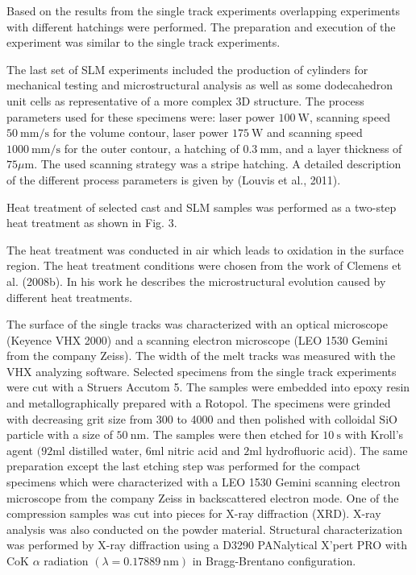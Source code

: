 \documentclass[10pt]{article}
\begin{document}
Based on the results from the single track experiments overlapping experiments with different hatchings were performed. The preparation and execution of the experiment was similar to the single track experiments.

The last set of SLM experiments included the production of cylinders for mechanical testing and microstructural analysis as well as some dodecahedron unit cells as representative of a more complex 3D structure. The process parameters used for these specimens were: laser power $100 \mathrm{~W}$, scanning speed $50 \mathrm{~mm} / \mathrm{s}$ for the volume contour, laser power $175 \mathrm{~W}$ and scanning speed $1000 \mathrm{~mm} / \mathrm{s}$ for the outer contour, a hatching of $0.3 \mathrm{~mm}$, and a layer thickness of $75 \mu \mathrm{m}$. The used scanning strategy was a stripe hatching. A detailed description of the different process parameters is given by (Louvis et al., 2011).

Heat treatment of selected cast and SLM samples was performed as a two-step heat treatment as shown in Fig. 3.

The heat treatment was conducted in air which leads to oxidation in the surface region. The heat treatment conditions were chosen from the work of Clemens et al. (2008b). In his work he describes the microstructural evolution caused by different heat treatments.

The surface of the single tracks was characterized with an optical microscope (Keyence VHX 2000) and a scanning electron microscope (LEO 1530 Gemini from the company Zeiss). The width of the melt tracks was measured with the VHX analyzing software. Selected specimens from the single track experiments were cut with a Struers Accutom 5. The samples were embedded into epoxy resin and metallographically prepared with a Rotopol. The specimens were grinded with decreasing grit size from 300 to 4000 and then polished with colloidal $\mathrm{SiO}$ particle with a size of $50 \mathrm{~nm}$. The samples were then etched for $10 \mathrm{~s}$ with Kroll's agent $(92 \mathrm{ml}$ distilled water, $6 \mathrm{ml}$ nitric acid and $2 \mathrm{ml}$ hydrofluoric acid). The same preparation except the last etching step was performed for the compact specimens which were characterized with a LEO 1530 Gemini scanning electron microscope from the company Zeiss in backscattered electron mode. One of the compression samples was cut into pieces for X-ray diffraction (XRD). X-ray analysis was also conducted on the powder material. Structural characterization was performed by X-ray diffraction using a D3290 PANalytical X'pert PRO with CoK $\alpha$ radiation $(\lambda=0.17889 \mathrm{~nm})$ in Bragg-Brentano configuration.
\end{document}
